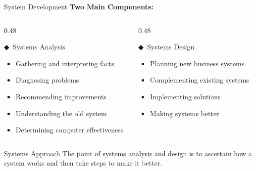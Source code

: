 \documentclass[aspectratio=169]{beamer}
\begin{document}
\begin{frame}{System Development}
    \textbf{Two Main Components:}
    
    \begin{columns}
        \begin{column}{0.48\textwidth}
            \begin{block}{◆\, Systems Analysis}
                \begin{itemize}
                    \item Gathering and interpreting facts
                    \item Diagnosing problems
                    \item Recommending improvements
                    \item Understanding the old system
                    \item Determining computer effectiveness
                \end{itemize}
            \end{block}
        \end{column}
        \begin{column}{0.48\textwidth}
            \begin{block}{◆\, Systems Design}
                \begin{itemize}
                    \item Planning new business systems
                    \item Complementing existing systems
                    \item Implementing solutions
                    \item Making systems better
                \end{itemize}
            \end{block}
        \end{column}
    \end{columns}
    
    \vspace{0.5cm}
    \begin{alertblock}{Systems Approach}
        The point of systems analysis and design is to ascertain how a system works and then take steps to make it better.
    \end{alertblock}
\end{frame}
\end{document}
